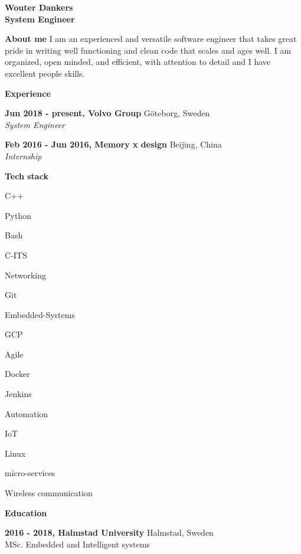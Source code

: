 \documentclass[a4paper,12pt,final]{memoir}
\newcommand{\Sep}{\vspace{1.5em}}
\newcommand{\SmallSep}{\vspace{0.5em}}
\newenvironment{AboutMe}
	{\ignorespaces\textbf{\color{NavyBlue} About me}}
	{\Sep\ignorespacesafterend}
\newcommand{\CVSection}[1]
	{\Large\textbf{#1}\par
	\SmallSep\normalsize\normalfont}
\newcommand{\CVItem}[1]
	{\textbf{\color{NavyBlue} #1}}
\begin{document}
\Huge\bfseries {\color{RoyalBlue} Wouter Dankers} \\
\Large\bfseries  System Engineer \\

\normalsize\normalfont

\begin{AboutMe}
I am an experienced and versatile software engineer that takes great pride in writing well functioning and clean code that scales and ages well. I am organized, open minded, and efficient, with attention to detail and I have excellent people skills.

\end{AboutMe}

\CVSection{Experience}
\CVItem{Jun 2018 - present, Volvo Group} \hfill G\"oteborg, Sweden \\
\emph{System Engineer}
\SmallSep

\CVItem{Feb 2016 - Jun 2016, Memory x design} \hfill Beijing, China \\
\emph{Internship}
\Sep

\CVSection{Tech stack}
\begin{multicols}{4}
\begin{compactitem}[\color{RoyalBlue}$\circ$]
	\item C++ 
	\item Python 
	\item Bash
	\item C-ITS
	\item Networking
	\item Git
	\item Embedded-Systems
	\item GCP
	\item Agile 
	\item Docker
	\item Jenkins
	\item Automation
	\item IoT
	\item Linux
	\item micro-services
	\item Wireless communication
\end{compactitem}
\end{multicols}
\Sep

\CVSection{Education}
\CVItem{2016 - 2018, Halmstad University} \hfill Halmstad, Sweden \\
MSc. Embedded and Intelligent systems
\SmallSep
\end{document}
